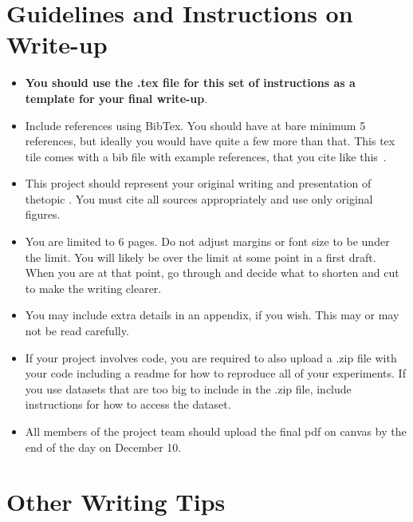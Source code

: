 \documentclass{article}
\begin{document}
	\section{Guidelines and Instructions on Write-up}
	\begin{itemize}
		\item \textbf{You should use the .tex file for this set of instructions as a template for your final write-up}.
		\item Include references using BibTex. You should have at bare minimum 5 references, but ideally you would have quite a few more than that. This tex tile comes with a bib file with example references, that you cite like this~\cite{dhillon2004kernel}.
	\item This project should represent your original writing and presentation of thetopic . You must cite all sources appropriately and use only original figures.
	\item You are limited to 6 pages. Do not adjust margins or font size to be under the limit. You will likely be over the limit at some point in a first draft. When you are at that point, go through and decide what to shorten and cut to make the writing clearer.
	\item You may include extra details in an appendix, if you wish. This may or may not be read carefully.
	\item If your project involves code, you are required to also upload a .zip file with your code including a readme for how to reproduce all of your experiments. If you use datasets that are too big to include in the .zip file, include instructions for how to access the dataset. 
	\item All members of the project team should upload the final pdf on canvas by the end of the day on December 10.
	\end{itemize}
	
	\section{Other Writing Tips}
	
\end{document}
